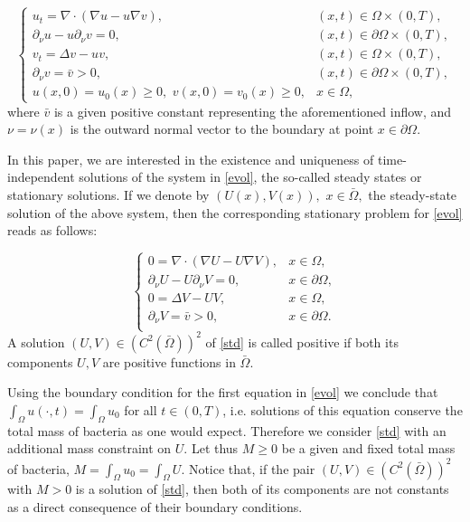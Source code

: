 \documentclass[12pt,a4paper]{amsart}
\theoremstyle{definition}
\theoremstyle{remark}
\numberwithin{equation}{section}
\numberwithin{theorem}{section}
\begin{document}
\begin{equation}\label{evol}
\left\{\begin{array}{lr}
u_t=\nabla\cdot(\nabla u-u\nabla v),&(x,t)\in\Omega\times(0,T),\\
\partial_\nu u-u\partial_\nu v=0,& (x,t)\in\partial\Omega\times(0,T),\\
v_t=\Delta v-uv,& (x,t)\in\Omega\times(0,T),\\
\partial_\nu v=\bar{v}>0,&(x,t)\in\partial\Omega\times(0,T),\\
u(x,0)=u_0(x)\geq 0,\,\,v(x,0)=v_0(x)\geq 0,& x\in\Omega,
\end{array}\right.
\end{equation}  
where $\bar{v}$ is a given positive constant representing the aforementioned inflow, and $\nu=\nu(x)$ is the outward normal vector to the boundary at point $x\in\partial \Omega$.

In this paper, we are interested in the existence and uniqueness of time-independent solutions of the system in \eqref{evol}, the so-called steady states or stationary solutions.   
If we denote by $(U(x),V(x)),$ $x\in\bar{\Omega},$ the steady-state solution of the above system, then the corresponding stationary problem for \eqref{evol} reads as follows: 

\begin{equation}\label{std}
\left\{\begin{array}{lr}
0=\nabla\cdot(\nabla U-U\nabla V),& x\in\Omega,\\
\partial_\nu U-U\partial_\nu V=0,& x\in\partial\Omega,\\
0=\Delta V-UV,& x\in\Omega,\\
\partial_\nu V=\bar{v}>0,& x\in\partial\Omega.\\
\end{array}\right.
\end{equation}  
A solution $(U,V)\in (C^2(\bar{\Omega}))^2$ of \eqref{std} is called positive if both its components $U,V$ are positive functions in $\bar\Omega$. 

Using the boundary condition for the first equation in \eqref{evol} we conclude that $\int_{\Omega}u(\cdot,t)=\int_\Omega u_0$ for all $t\in(0,T)$, i.e. solutions of this equation conserve the total mass of bacteria as one would expect. Therefore we consider \eqref{std} with an additional mass constraint on $U.$ Let thus $M\geq 0$ be a given and fixed total mass of bacteria, $M=\int_\Omega u_0=\int_\Omega U$. Notice that, if the pair $(U,V)\in (C^2(\bar{\Omega}))^2$ with $M>0$ is a solution of \eqref{std}, then both of its components are not constants as a direct consequence of their boundary conditions. 
\end{document}
